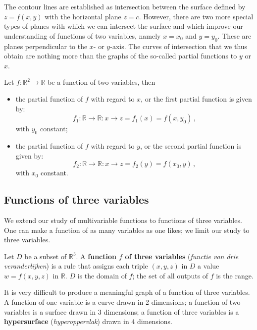 
The contour lines are established as intersection between the surface defined by $z=f(x,y)$ with the horizontal plane $z=c$. However, there are two more special types of planes with which we can intersect the surface and which improve our understanding of functions of two variables, namely $x=x_0$ and $y=y_0$. These are planes perpendicular to the $x$- or $y$-axis. The  curves of intersection that we thus obtain  are  nothing more than the graphs of the so-called partial functions to $y$ or $x$.

\begin{definition}
Let $f:\mathbb{R}^2\to\mathbb{R}$ be a function of two variables, then 
\begin{itemize}
    \item the partial function of $f$ with regard to $x$, or the first partial function is given by:
    $$
    f_1:\mathbb{R}\to\mathbb{R}: x\to z=f_1(x)=f(x,y_0)\,,
    $$
    with $y_0$ constant;
    \item the partial function of $f$ with regard to $y$,  or the second partial function is given by:
    $$
    f_2:\mathbb{R}\to\mathbb{R}: x\to z=f_2(y)=f(x_0,y)\,,
    $$
    with $x_0$ constant.    
\end{itemize}
\end{definition}


\ifcalculus
\subsection{Functions of three variables}

We extend our study of multivariable functions to functions of three variables. One can make a function of as many variables as one likes; we limit our study to three variables.

\begin{definition}\label{def:multi3}
Let $D$ be a subset of $\mathbb{R}^3$. A \textbf{function $f$ of three variables} (\textit{functie van drie veranderlijken}) is a rule that assigns each triple $(x,y,z)$ in $D$ a value $w=f(x,y,z)$ in $\mathbb{R}$. $D$ is the domain of $f$; the set of all outputs of $f$ is the range.
\end{definition}

It is very difficult to produce a meaningful graph of a function of three variables. A function of one variable is a curve drawn in 2 dimensions; a function of two variables is a surface drawn in 3 dimensions; a function of three variables is a \textbf{hypersurface} (\textit{hyperoppervlak}) drawn in 4 dimensions.
\fi

